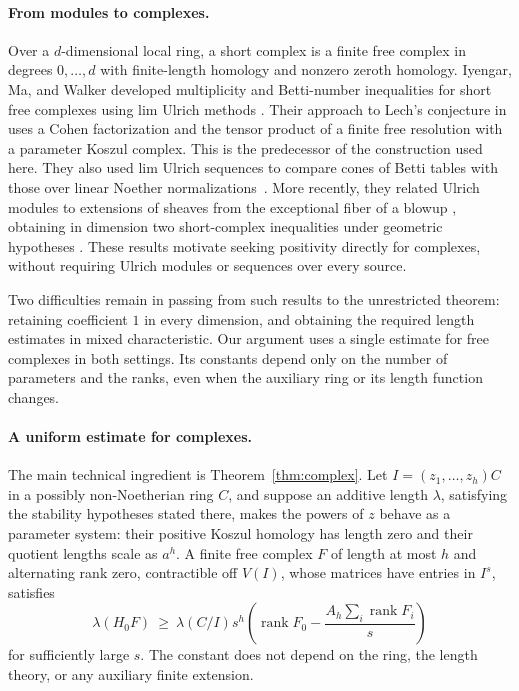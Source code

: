 \documentclass[11pt]{article}
\numberwithin{equation}{section}
\theoremstyle{definition}
\DeclareMathOperator{\rank}{rank}
\begin{document}
\paragraph{From modules to complexes.}
Over a $d$-dimensional local ring, a short complex is a finite free
complex in degrees $0,\ldots,d$ with finite-length homology and
nonzero zeroth homology.
Iyengar, Ma, and Walker developed multiplicity and Betti-number
inequalities for short free complexes using lim Ulrich methods
\cite{IMW2022}. Their approach to Lech's conjecture in
\cite[Proposition~8.3]{IMW2022} uses a Cohen factorization and the
tensor product of a finite free resolution with a parameter Koszul
complex. This is the predecessor of the construction used here.
They also used lim Ulrich sequences to compare cones of Betti tables
with those over linear Noether normalizations~\cite{IMW2023}.
More recently, they related Ulrich modules to extensions of sheaves
from the exceptional fiber of a blowup
\cite[Theorem~1.1]{IMW2025}, obtaining in dimension two
short-complex inequalities under geometric hypotheses
\cite[Theorems~5.2 and~6.9]{IMW2025}.
These results motivate seeking positivity directly for complexes,
without requiring Ulrich modules or sequences over every source.

Two difficulties remain in passing from such results to the
unrestricted theorem: retaining coefficient $1$ in every dimension,
and obtaining the required length estimates in mixed characteristic.
Our argument uses a single estimate for free complexes in both
settings. Its constants depend only on the number of parameters and the ranks,
even when the auxiliary ring or its length function changes.

\paragraph{A uniform estimate for complexes.}
The main technical ingredient is Theorem~\ref{thm:complex}. Let
$I=(z_1,\ldots,z_h)C$ in a possibly non-Noetherian ring $C$, and suppose an
additive length $\lambda$, satisfying the stability hypotheses stated
there, makes the powers of $z$ behave as a parameter
system: their positive Koszul homology has length zero and their quotient
lengths scale as $a^h$. A finite free complex $F$ of length at most $h$
and alternating rank zero, contractible off $V(I)$, whose matrices have
entries in $I^s$, satisfies
\[
 \lambda(H_0F)\ \geq\ \lambda(C/I)s^h
       \left(\rank F_0-\frac{A_h\sum_i\rank F_i}{s}\right)
\]
for sufficiently large $s$. The constant does not depend on the ring,
the length theory, or any auxiliary finite extension.
\end{document}
